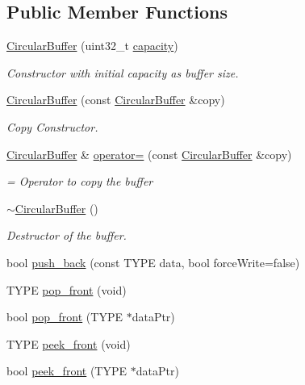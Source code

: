 \subsection*{Public Member Functions}
\begin{DoxyCompactItemize}
\item 
\hyperlink{classCircularBuffer_ab360f7d423d23878d71a5f9858519379}{Circular\+Buffer} (uint32\+\_\+t \hyperlink{classCircularBuffer_a87e9e9d7eb50070d2b4a21b0462432e9}{capacity})
\begin{DoxyCompactList}\small\item\em Constructor with initial capacity as buffer size. \end{DoxyCompactList}\item 
\hyperlink{classCircularBuffer_acb40a5e54d92f38fee343082a4840cbe}{Circular\+Buffer} (const \hyperlink{classCircularBuffer}{Circular\+Buffer} \&copy)
\begin{DoxyCompactList}\small\item\em Copy Constructor. \end{DoxyCompactList}\item 
\hyperlink{classCircularBuffer}{Circular\+Buffer} \& \hyperlink{classCircularBuffer_a390a6d1e651447fb23c155a6928097c1}{operator=} (const \hyperlink{classCircularBuffer}{Circular\+Buffer} \&copy)
\begin{DoxyCompactList}\small\item\em = Operator to copy the buffer \end{DoxyCompactList}\item 
\hyperlink{classCircularBuffer_a09f9833297c2cf6c1f535be9478474c1}{$\sim$\+Circular\+Buffer} ()
\begin{DoxyCompactList}\small\item\em Destructor of the buffer. \end{DoxyCompactList}\item 
bool \hyperlink{classCircularBuffer_a874e11e8de40e5d6d478a39087960af8}{push\+\_\+back} (const T\+Y\+PE data, bool force\+Write=false)
\item 
T\+Y\+PE \hyperlink{classCircularBuffer_af4aab198b93af59b55a69584ab015c2b}{pop\+\_\+front} (void)
\item 
bool \hyperlink{classCircularBuffer_ada422a5714f04db84a510d6491b624cd}{pop\+\_\+front} (T\+Y\+PE $\ast$data\+Ptr)
\item 
T\+Y\+PE \hyperlink{classCircularBuffer_a578d0618578c41b0580466af3d264a5b}{peek\+\_\+front} (void)
\item 
bool \hyperlink{classCircularBuffer_ac0e89e5c880ef100b5cbb8cbd07ab801}{peek\+\_\+front} (T\+Y\+PE $\ast$data\+Ptr)

\end{DoxyCompactItemize}
